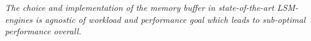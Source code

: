 \begin{center}
\textit{The choice and implementation of the memory buffer in state-of-the-art LSM-engines is agnostic of workload and performance goal which leads to sub-optimal performance overall.}
\end{center}
    




 

